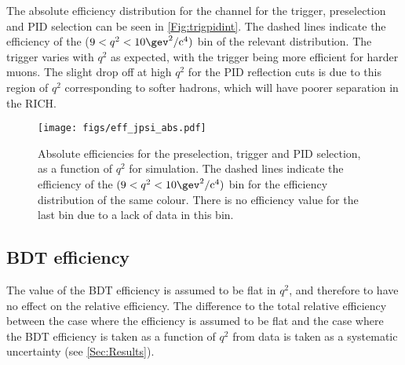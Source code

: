 

The absolute efficiency distribution for the \Lbpi channel for the trigger, preselection and PID selection can be seen in \autoref{Fig:trigpidint}. The dashed lines indicate the efficiency of the ($9<q^{2}<10 \gev^{2}/\mathrm{c}^{4})$ bin of the relevant distribution. The trigger varies with $q^{2}$ as expected, with the trigger being more efficient for harder muons. The slight drop off at high $q^{2}$ for the PID reflection cuts is due to this region of $q^{2}$ corresponding to softer hadrons, which will have poorer separation in the RICH. %

\begin{figure}[h]
  \centering
  \texttt{[image: figs/eff\_jpsi\_abs.pdf]}
  \caption{Absolute efficiencies for the preselection, trigger and PID selection,  as a function of $q^{2}$ for \Lbpi simulation. The dashed lines indicate the efficiency of the $(9<q^{2}<10\gev^{2}/\mathrm{c}^{4})$ bin for the efficiency distribution of the same colour. There is no efficiency value for the last bin due to a lack of data in this bin.}
  \label{Fig:trigpidint}
\end{figure}


\subsection{BDT efficiency}
The value of the BDT efficiency is assumed to be flat in $q^{2}$, and therefore to have no effect on the relative efficiency. The difference to the total relative efficiency between the case where the efficiency is  assumed to be flat and the case where the BDT efficiency is taken as a function of $q^{2}$ from \LbK data is taken as a systematic uncertainty (see \autoref{Sec:Results}).  %


